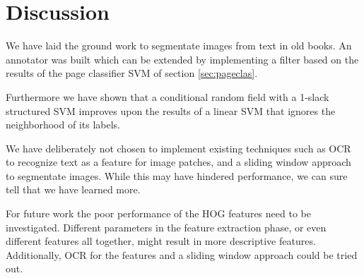 \section{Discussion}%
\label{sec:discussionconclusion}

We have laid the ground work to segmentate images from text in old books. An
annotator was built which can be extended by implementing a filter
based on the results of the page classifier SVM of section \ref{sec:pageclas}.

Furthermore we have shown that a conditional random field with a 1-slack
structured SVM improves upon the results of a linear SVM that ignores the
neighborhood of its labels.

We have deliberately not chosen to implement existing techniques such as OCR to
recognize text as a feature for image patches, and a sliding window approach to
segmentate images. While this may have hindered performance, we can sure tell
that we have learned more.

For future work the poor performance of the HOG features need to be
investigated. Different parameters in the feature extraction phase, or even
different features all together, might result in more descriptive features.
Additionally, OCR for the features and a sliding window approach could be tried
out.

